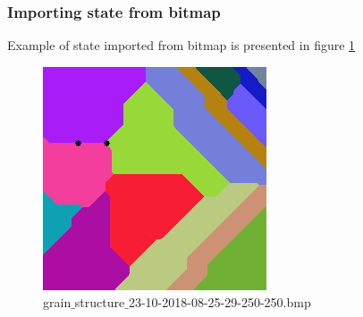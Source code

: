 \documentclass[a4paper, 11pt]{article}
\begin{document}
\subsubsection{Importing state from bitmap}
Example of state imported from bitmap is presented in figure \ref{ExportedBitmapLabel}
\begin{figure}[H]
\centering
  \includegraphics[]{ExportedBitmap}
  \caption{grain$\_$structure$\_$23-10-2018-08-25-29-250-250.bmp}
  \label{ExportedBitmapLabel}
\end{figure}
\end{document}
